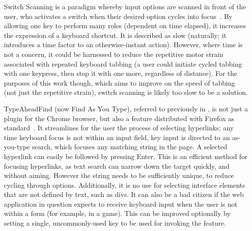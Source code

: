 \documentclass[11pt,openright,a4paper]{report}
\begin{document}
Switch Scanning is a paradigm whereby input options are scanned in front of the user, who activates a switch when their desired option cycles into focus~\cite{hendrix1997adapting}. By allowing one key to perform many roles (dependent on time elapsed), it increases the expression of a keyboard shortcut. It is described as slow (naturally; it introduces a time factor to an otherwise-instant action). However, where time is not a concern, it could be harnessed to reduce the repetitive motor strain associated with repeated keyboard tabbing (a user could initiate cycled tabbing with one keypress, then stop it with one more, regardless of distance). For the purposes of this work though, which aims to improve on the speed of tabbing (not just the repetitive strain), switch scanning is likely too slow to be a solution.

TypeAheadFind (now Find As You Type), referred to previously in , is not just a plugin for the Chrome browser, but also a feature distributed with Firefox as standard~\cite{firefoxshortcuts}. It streamlines for the user the process of selecting hyperlinks; any time keyboard focus is not within an input field, key input is directed to an as-you-type search, which focuses any matching string in the page. A selected hyperlink can easily be followed by pressing Enter. This is an efficient method for focusing hyperlinks, as text search can narrow down the target quickly, and without aiming. However the string needs to be sufficiently unique, to reduce cycling through options. Additionally, it is no use for selecting interface elements that are not defined by text, such as divs. It can also be a bad citizen if the web application in question expects to receive keyboard input when the user is not within a form (for example, in a game). This can be improved optionally by setting a single, uncommonly-used key to be used for invoking the feature.
\end{document}
